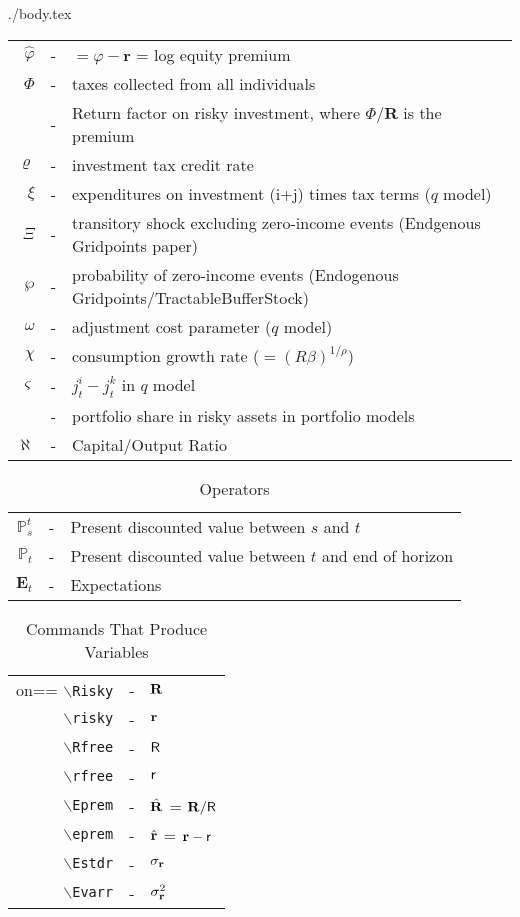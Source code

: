\documentclass{econtex}
\begin{document}
\begin{verbatimwrite}{./body.tex}
\begin{table}
\begin{tabular}{rcl}
\\  $\hat{\varphi}$ & - & $= \varphi - \mathbf{r}$ = log equity premium
\\  $\Phi$    & - & taxes collected from all individuals
\\            & - & Return factor on risky investment, where $\Phi/\mathbf{R}$ is the premium
\\  $\varrho$    & - & investment tax credit rate
\\  $\xi$     & - & expenditures on investment (i+j) times tax terms ($q$ model)
\\  $\Xi$     & - & transitory shock excluding zero-income events (Endgenous Gridpoints paper)
\\  $\wp$     & - & probability of zero-income events (Endogenous Gridpoints/TractableBufferStock)
\\  $\omega$  & - & adjustment cost parameter ($q$ model)
\\  $\chi$    & - & consumption growth rate ($=(R \beta)^{1/\rho}$)
\\  $\varsigma$ & - & $j_{t}^{i}-j_{t}^{k}$ in $q$ model
\\   & - & portfolio share in risky assets in portfolio models
\\  $\aleph$  & - & Capital/Output Ratio
\end{tabular}
\end{table}

\begin{table}
\caption{Operators}
\begin{tabular}{rcl}
    $\mathbb{P}_{s}^{t}$ & - & Present discounted value between $s$ and $t$
\\  $\mathbb{P}_{t}$     & - & Present discounted value between $t$ and end of horizon
\\ $\mathbf{E}_{t}$ & - & Expectations
\end{tabular}
\end{table}


\begin{table}
\caption{Commands That Produce Variables}
\begin{tabular}{rcl}on==
   \texttt{$\backslash$Risky} & - & $\mathbf{R}$ 
\\ \texttt{$\backslash$risky} & - & $\mathbf{r}$
\\ \texttt{$\backslash$Rfree} & - & $\mathsf{R}$
\\ \texttt{$\backslash$rfree} & - & $\mathsf{r}$
\\ \texttt{$\backslash$Eprem} & - & $\hat{\mathbf{R}}$ = $\mathbf{R}/\mathsf{R}$
\\ \texttt{$\backslash$eprem} & - & $\hat{\mathbf{r}}$ = $\mathbf{r} - \mathsf{r}$
\\ \texttt{$\backslash$Estdr} & - & $\sigma_{\mathbf{r}}$
\\ \texttt{$\backslash$Evarr} & - & $\sigma_{\mathbf{r}}^{2}$
\end{tabular}
\end{table}

\end{verbatimwrite}

\end{document}

